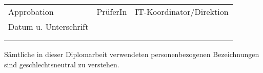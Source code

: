 \begin{table}[htbp]
\centering
\begin{tabular}{|p{4cm}|p{4cm}|p{5cm}|}
\hline
  Approbation & PrüferIn & IT-Koordinator/Direktion \\
  Datum u. Unterschrift & & \\
  && \\
  && \\
\hline
\end{tabular}
\end{table}

\begin{center}
Sämtliche in dieser Diplomarbeit verwendeten personenbezogenen Bezeichnungen sind geschlechtsneutral zu verstehen.
\end{center}